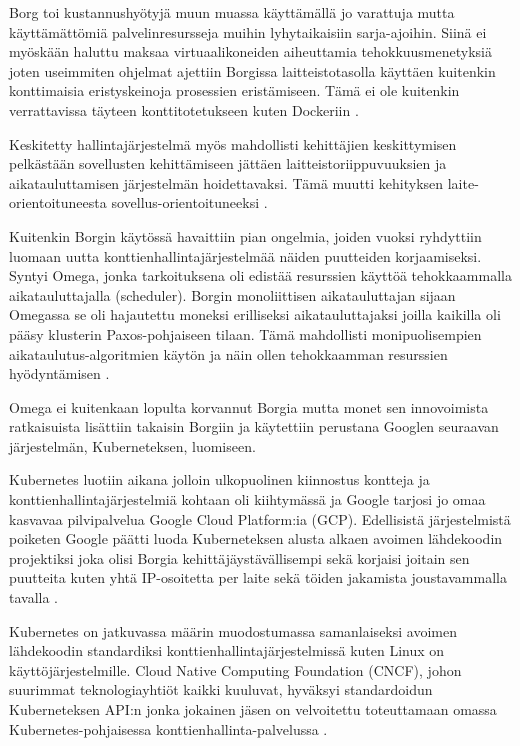 \documentclass[finnish,gradu]{tktltiki3}
\begin{document}
    Borg toi kustannushyötyjä muun muassa käyttämällä jo varattuja mutta käyttämättömiä palvelinresursseja muihin lyhytaikaisiin sarja-ajoihin. Siinä ei myöskään haluttu maksaa virtuaalikoneiden aiheuttamia tehokkuusmenetyksiä joten useimmiten ohjelmat ajettiin Borgissa laitteistotasolla käyttäen kuitenkin konttimaisia eristyskeinoja prosessien eristämiseen. Tämä ei ole kuitenkin verrattavissa täyteen konttitotetukseen kuten Dockeriin \cite{management-with-borg}.
    
    Keskitetty hallintajärjestelmä myös mahdollisti kehittäjien keskittymisen pelkästään sovellusten kehittämiseen jättäen laitteistoriippuvuuksien ja aikatauluttamisen järjestelmän hoidettavaksi. Tämä muutti kehityksen laite-orientoituneesta sovellus-orientoituneeksi \cite{borg-omega-kubernetes}.
    
    Kuitenkin Borgin käytössä havaittiin pian ongelmia, joiden vuoksi ryhdyttiin luomaan uutta konttienhallintajärjestelmää näiden puutteiden korjaamiseksi. Syntyi Omega, jonka tarkoituksena oli edistää resurssien käyttöä tehokkaammalla aikatauluttajalla (scheduler). Borgin monoliittisen aikatauluttajan sijaan Omegassa se oli hajautettu moneksi erilliseksi aikatauluttajaksi joilla kaikilla oli pääsy klusterin Paxos-pohjaiseen tilaan. Tämä mahdollisti monipuolisempien aikataulutus-algoritmien käytön ja näin ollen tehokkaamman resurssien hyödyntämisen \cite{omega}.
    
    Omega ei kuitenkaan lopulta korvannut Borgia mutta monet sen innovoimista ratkaisuista lisättiin takaisin Borgiin ja käytettiin perustana Googlen seuraavan järjestelmän, Kuberneteksen, luomiseen.
    
    Kubernetes luotiin aikana jolloin ulkopuolinen kiinnostus kontteja ja konttienhallintajärjestelmiä kohtaan oli kiihtymässä ja Google tarjosi jo omaa kasvavaa pilvipalvelua Google Cloud Platform:ia (GCP). Edellisistä järjestelmistä poiketen Google päätti luoda Kuberneteksen alusta alkaen avoimen lähdekoodin projektiksi joka olisi Borgia kehittäjäystävällisempi sekä korjaisi joitain sen puutteita kuten yhtä IP-osoitetta per laite sekä töiden jakamista joustavammalla tavalla \cite{borg-omega-kubernetes}.
    
    Kubernetes on jatkuvassa määrin muodostumassa samanlaiseksi avoimen lähdekoodin standardiksi konttienhallintajärjestelmissä kuten Linux on käyttöjärjestelmille. Cloud Native Computing Foundation (CNCF), johon suurimmat teknologiayhtiöt kaikki kuuluvat, hyväksyi standardoidun Kuberneteksen API:n jonka jokainen jäsen on velvoitettu toteuttamaan omassa Kubernetes-pohjaisessa konttienhallinta-palvelussa \cite{kubernetes-cncf-standard-announcement}.
    
\end{document}
